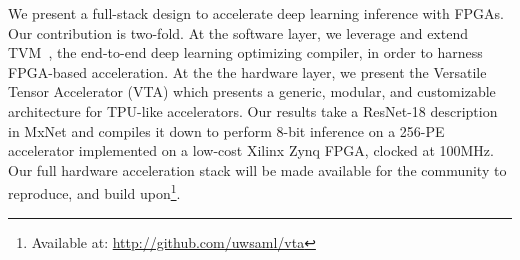 We present a full-stack design to accelerate deep learning inference with FPGAs. Our contribution is two-fold. At the software layer, we leverage and extend TVM~\cite{chen:TVM}, the end-to-end deep learning optimizing compiler, in order to harness FPGA-based acceleration. At the the hardware layer, we present the Versatile Tensor Accelerator (VTA) which presents a generic, modular, and customizable architecture for TPU-like accelerators.
Our results take a ResNet-18 description in MxNet and compiles it down to perform 8-bit inference on a 256-PE accelerator implemented on a low-cost Xilinx Zynq FPGA, clocked at 100MHz.
Our full hardware acceleration stack will be made available for the community to reproduce, and build upon\footnote{Available at: \url{http://github.com/uwsaml/vta}}.
